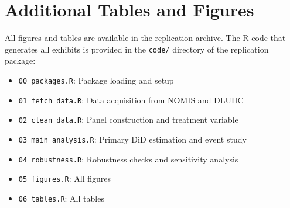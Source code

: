 \documentclass[12pt]{article}
\begin{document}
\section{Additional Tables and Figures}
\label{app:additional}

All figures and tables are available in the replication archive. The R code that generates all exhibits is provided in the \texttt{code/} directory of the replication package:
\begin{itemize}
\item \texttt{00\_packages.R}: Package loading and setup
\item \texttt{01\_fetch\_data.R}: Data acquisition from NOMIS and DLUHC
\item \texttt{02\_clean\_data.R}: Panel construction and treatment variable
\item \texttt{03\_main\_analysis.R}: Primary DiD estimation and event study
\item \texttt{04\_robustness.R}: Robustness checks and sensitivity analysis
\item \texttt{05\_figures.R}: All figures
\item \texttt{06\_tables.R}: All tables
\end{itemize}
\end{document}
